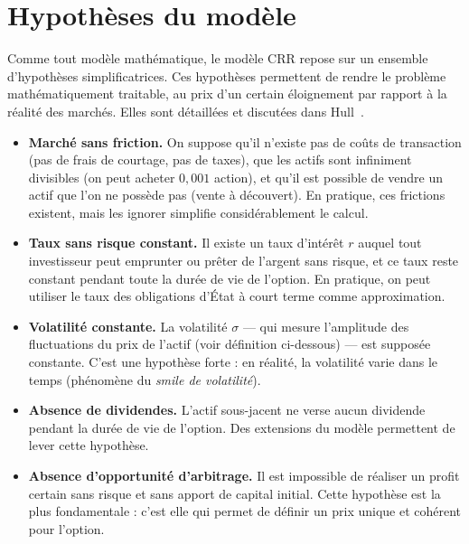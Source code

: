 \documentclass[11pt]{report}
\begin{document}
\section{Hypothèses du modèle}

Comme tout modèle mathématique, le modèle CRR repose sur un ensemble
d'hypothèses simplificatrices. Ces hypothèses permettent de rendre le
problème mathématiquement traitable, au prix d'un certain éloignement par
rapport à la réalité des marchés. Elles sont détaillées et discutées dans
Hull~\cite{hull2018}.

\begin{itemize}
    \item \textbf{Marché sans friction.} On suppose qu'il n'existe pas de
    coûts de transaction (pas de frais de courtage, pas de taxes), que les
    actifs sont infiniment divisibles (on peut acheter $0{,}001$ action), et
    qu'il est possible de vendre un actif que l'on ne possède pas (vente à
    découvert). En pratique, ces frictions existent, mais les ignorer simplifie
    considérablement le calcul.

    \item \textbf{Taux sans risque constant.} Il existe un taux d'intérêt $r$
    auquel tout investisseur peut emprunter ou prêter de l'argent sans risque,
    et ce taux reste constant pendant toute la durée de vie de l'option. En
    pratique, on peut utiliser le taux des obligations d'État à court terme
    comme approximation.

    \item \textbf{Volatilité constante.} La volatilité $\sigma$ — qui mesure
    l'amplitude des fluctuations du prix de l'actif (voir définition
    ci-dessous) — est supposée constante. C'est une hypothèse forte : en
    réalité, la volatilité varie dans le temps (phénomène du \textit{smile
    de volatilité}).

    \item \textbf{Absence de dividendes.} L'actif sous-jacent ne verse aucun
    dividende pendant la durée de vie de l'option. Des extensions du modèle
    permettent de lever cette hypothèse.

    \item \textbf{Absence d'opportunité d'arbitrage.} Il est impossible de
    réaliser un profit certain sans risque et sans apport de capital initial.
    Cette hypothèse est la plus fondamentale : c'est elle qui permet de
    définir un prix unique et cohérent pour l'option.
\end{itemize}
\end{document}

